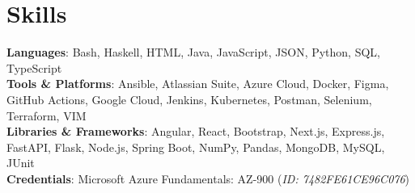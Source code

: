 \documentclass[letterpaper,11pt]{article}
\begin{document}

 \section{Skills}
 \begin{itemize}[leftmargin=0.15in, label={}]
    \small{\item{
     \textbf{Languages}{: Bash, Haskell, HTML, Java, JavaScript, JSON, Python, SQL, TypeScript} \\
     \textbf{Tools \& Platforms}{: Ansible, Atlassian Suite, Azure Cloud, Docker, Figma, GitHub Actions, Google Cloud, Jenkins, Kubernetes, Postman, Selenium, Terraform, VIM} \\
     \textbf{Libraries \& Frameworks}{: Angular, React, Bootstrap, Next.js, Express.js, FastAPI, Flask, Node.js, Spring Boot, NumPy, Pandas, MongoDB, MySQL, JUnit} \\
     \textbf{Credentials}{: Microsoft Azure Fundamentals: AZ-900 (\emph{ID: 7482FE61CE96C076})}
    }}
 \end{itemize}

\end{document}
